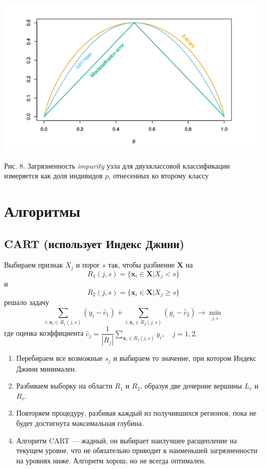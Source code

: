 \documentclass{article}
\begin{document}
\begin{center}
	\includegraphics[scale=1]{pic5}
\end{center}
\begin{center}
	Рис. 8. Загрязненность \textit{impurity} узла для двухклассовой классификации измеряется как доля индивидов $p$, отнесенных ко второму классу
\end{center}

\newpage

\section{Алгоритмы}

\subsection{CART (использует Индекс Джини)}

\noindent Выбираем признак $X_j$ и порог $s$ так, чтобы разбиение $\textbf{X}$ на
$$R_1(j,s) = \{ \textbf{x}_i \in \textbf{X} | X_j < s \}$$
и
$$R_2(j,s) = \{ \textbf{x}_i \in \textbf{X} | X_j \geq s \}$$
решало задачу
\begin{equation}
	\sum\limits_{i:\textbf{x}_i \in R_1 (j,s)} (y_i - \hat{c}_1) + 	\sum\limits_{i:\textbf{x}_i \in R_2 (j,s)} (y_i - \hat{c}_2) \to \min_{j,s}
\end{equation}
где оценка коэффициента $\hat{c}_j = \dfrac{1}{|R_j|} \sum\limits_{\textbf{x}_i \in R_j(j,s)} y_i, \quad j = 1,2.$\\

\begin{enumerate}
	\item Перебираем все возможные $s_j$ и выбираем то значение, при котором Индекс Джини минимален.
	\item Разбиваем выборку на области $R_1$ и $R_2$, образуя две дочерние вершины $L_v$ и $R_v$.
	\item Повторяем процедуру, разбивая каждый из получившихся регионов, пока не будет достигнута максимальная глубина.
	\item Алгоритм CART --- жадный, он выбирает наилучшее расщепление на текущем уровне, что не обязательно приводит к наименьшей загрязненности на уровнях ниже. Алгоритм хорош, но не всегда оптимален.
\end{enumerate}
\end{document}
